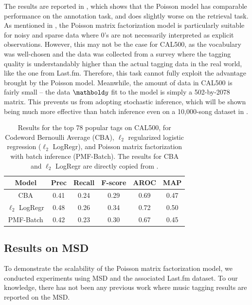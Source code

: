The results are reported in , which shows that the Poisson model has comparable performance on the annotation task, and does slightly worse on the retrieval task. As mentioned in , the Poisson matrix factorization model is particularly suitable for noisy and sparse data where $0$'s are not necessarily interpreted as explicit observations. However, this may not be the case for CAL500, as the vocabulary was well-chosen and the data was collected from a survey where the tagging quality is understandably higher than the actual tagging data in the real world, like the one from Last.fm. Therefore, this task cannot fully exploit the advantage brought by the Poisson model. 
Meanwhile, the amount of data in CAL500 is fairly small -- the data $\mb{y}$ fit to the model is simply a 502-by-2078 matrix. This prevents us from adopting stochastic inference, which will be shown being much more effective than batch inference even on a 10,000-song dataset in . 

\begin{table}
\centering
  \begin{tabular}{ c  c  c  c  c  c }
    \toprule
    Model & Prec & Recall & F-score & AROC & MAP \\ \midrule
      CBA &  0.41 & 0.24    &   0.29    &   0.69  & 0.47 \\
     $\ell_2$ LogRegr & 0.48  &  0.26  & 0.34  &  0.72 & 0.50\\
    PMF-Batch & 0.42  &  0.23 & 0.30 & 0.67 & 0.45 \\
    \bottomrule
  \end{tabular}
  \caption{Results for the top 78 popular tags on CAL500, for Codeword Bernoulli Average (CBA), $\ell_2$ regularized logistic regression ($\ell_2$ LogRegr), and Poisson matrix factorization with batch inference (PMF-Batch). The results for CBA and $\ell_2$ LogRegr are directly copied from \cite{xie2011music}.} 
  \label{tab:cal500}
\end{table}


\subsection{Results on MSD}\label{chpt:tagging:sec:msd}
To demonstrate the scalability of the Poisson matrix factorization model, we conducted experiments using MSD and the associated Last.fm dataset. To our knowledge, there has not been any previous work where music tagging results are reported on the MSD. 

